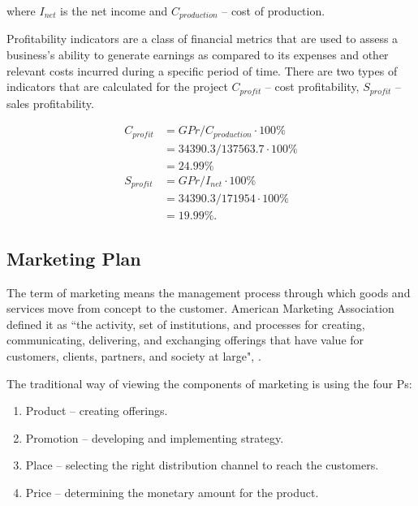 \noindent
where $I_{net}$ is the net income and $C_{production}$ -- cost of production.

Profitability indicators are a class of financial metrics that are used to assess a business's ability to generate earnings as compared to its expenses and other relevant costs incurred during a specific period of time. There are two types of indicators that are calculated for the project $C_{profit}$ -- cost profitability, $S_{profit}$ -- sales profitability.

\begin{equation}
 \begin{split}
  C_{profit} &= GPr / C_{production} \cdot 100\%\\
             &= 34390.3 / 137563.7 \cdot 100\% \\
             &= 24.99 \%\\
  S_{profit} &= GPr / I_{net} \cdot 100\% \\
             &= 34390.3 / 171954 \cdot 100\% \\
             &= 19.99 \%.
 \end{split}
\end{equation}

\subsection{Marketing Plan}

The term of marketing means the management process through which goods and services move from concept to the customer. American Marketing Association defined it as ``the activity, set of institutions, and processes for creating, communicating, delivering, and exchanging offerings that have value for customers, clients, partners, and society at large", \cite{marketing}.

The traditional way of viewing the components of marketing is using the four Ps:

\begin{enumerate}

\item Product -- creating offerings.
\item Promotion -- developing and implementing strategy.
\item Place -- selecting the right distribution channel to reach the customers.
\item Price -- determining the monetary amount for the product.

\end{enumerate}

